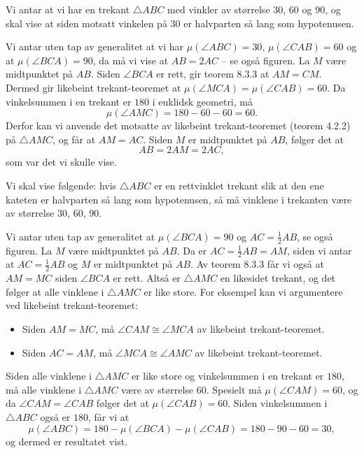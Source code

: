 \begin{oppgave}[8.3.2]
    Vi antar at vi har en trekant $\triangle ABC$ med vinkler av størrelse $30$, $60$ og $90$, og skal vise at siden motsatt vinkelen på $30$ er halvparten så lang som hypotenusen. 
    
    Vi antar uten tap av generalitet at vi har $\mu(\angle ABC) = 30$, $\mu(\angle CAB) = 60$ og at $\mu(\angle BCA) = 90$, da må vi vise at $AB = 2AC$ – se også figuren. 
    La $M$ være midtpunktet på $AB$. 
    Siden $\angle BCA$ er rett, gir teorem 8.3.3 at $AM = CM$. 
    Dermed gir likebeint trekant-teoremet at $\mu(\angle MCA) = \mu(\angle CAB) = 60$. 
    Da vinkelsummen i en trekant er $180$ i euklidsk geometri, må
    $$\mu(\angle AMC) = 180 - 60 - 60 = 60.$$
    Derfor kan vi anvende det motsatte av likebeint trekant-teoremet (teorem 4.2.2) på $\triangle AMC$, og får at $AM = AC$. 
    Siden $M$ er midtpunktet på $AB$, følger det at
    $$AB = 2AM = 2AC,$$
    som var det vi skulle vise.

    \begin{figure}[H]
        \centering
         
    \end{figure}
\end{oppgave}

\begin{oppgave}[8.3.3]
    Vi skal vise følgende: hvis $\triangle ABC$ er en rettvinklet trekant slik at den ene kateten er halvparten så lang som hypotenusen, så må vinklene i trekanten være av størrelse $30$, $60$, $90$. 
    
    Vi antar uten tap av generalitet at $\mu(\angle BCA) = 90$ og $AC = \frac{1}{2} AB$, se også figuren. 
    La $M$ være midtpunktet på $AB$. Da er $AC = \frac{1}{2} AB = AM$, siden vi antar at $AC = \frac{1}{2} AB$ og $M$ er midtpunktet på $AB$. 
    Av teorem 8.3.3 får vi også at $AM = MC$ siden $\angle BCA$ er rett. 
    Altså er $\triangle AMC$ en likesidet trekant, og det følger at alle vinklene i $\triangle AMC$ er like store. 
    For eksempel kan vi argumentere ved likebeint trekant-teoremet:
    \begin{itemize}
        \item Siden $AM = MC$, må $\angle CAM \cong \angle MCA$ av likebeint trekant-teoremet.
        \item Siden $AC = AM$, må $\angle MCA \cong \angle AMC$ av likebeint trekant-teoremet.
    \end{itemize}
    Siden alle vinklene i $\triangle AMC$ er like store og vinkelsummen i en trekant er $180$, må alle vinklene i $\triangle AMC$ være av størrelse $60$. 
    Spesielt må $\mu(\angle CAM) = 60$, og da $\angle CAM = \angle CAB$ følger det at $\mu(\angle CAB) = 60$. 
    Siden vinkelsummen i $\triangle ABC$ også er $180$, får vi at
    $$ \mu(\angle ABC) = 180 - \mu(\angle BCA) - \mu(\angle CAB) = 180 - 90 - 60 = 30,$$
    og dermed er resultatet vist.

    \begin{figure}[H]
        \centering
         
    \end{figure}
\end{oppgave}